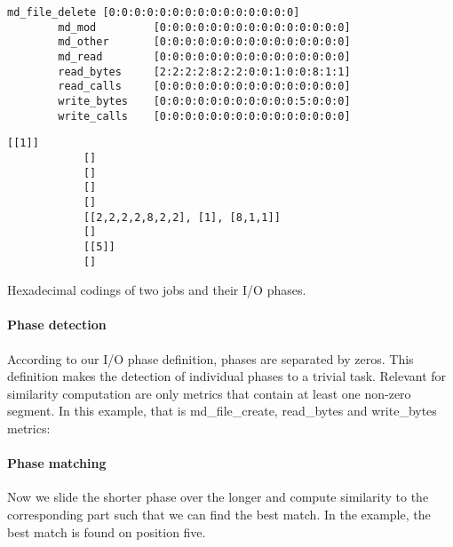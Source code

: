 \documentclass{jhps}
\begin{document}
\begin{listing}
\begin{minipage}{\textwidth}
\begin{minipage}{0.60\textwidth}
\begin{lstlisting}[basicstyle=\fontsize{8}{8}\ttfamily]
		md_file_delete [0:0:0:0:0:0:0:0:0:0:0:0:0:0:0]
		md_mod         [0:0:0:0:0:0:0:0:0:0:0:0:0:0:0]
		md_other       [0:0:0:0:0:0:0:0:0:0:0:0:0:0:0]
		md_read        [0:0:0:0:0:0:0:0:0:0:0:0:0:0:0]
		read_bytes     [2:2:2:2:8:2:2:0:0:1:0:0:8:1:1]
		read_calls     [0:0:0:0:0:0:0:0:0:0:0:0:0:0:0]
		write_bytes    [0:0:0:0:0:0:0:0:0:0:0:5:0:0:0]
		write_calls    [0:0:0:0:0:0:0:0:0:0:0:0:0:0:0]
		\end{lstlisting}
		\vspace{-2em}
		\label{lst:sim:pm_quant:job_b}
		\end{minipage}
		\noindent\begin{minipage}{0.39\textwidth}
			\begin{lstlisting}[basicstyle=\fontsize{8}{8}\ttfamily]
			[[1]]
			[]
			[]
			[]
			[]
			[[2,2,2,2,8,2,2], [1], [8,1,1]]
			[]
			[[5]]
			[]
			\end{lstlisting}
			\vspace{-2em}
			\label{lst:sim:pm_quant:phases:job_b}
		\end{minipage}
	\end{minipage}
	\caption{Hexadecimal codings of two jobs and their I/O phases.}
	\label{lst:sim:pm_quant}
\end{listing}



\paragraph{Phase detection}
According to our I/O phase definition, phases are separated by zeros.
This definition makes the detection of individual phases to a trivial task.
Relevant for similarity computation are only metrics that contain at least one non-zero segment.
In this example, that is md\_file\_create, read\_bytes and write\_bytes metrics:


\paragraph{Phase matching}
Now we slide the shorter phase over the longer and compute similarity to the corresponding part such that we can find the best match.
In the example, the best match is found on position five.
\end{document}
